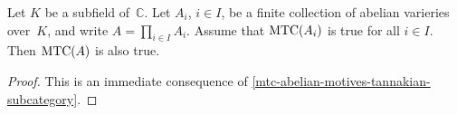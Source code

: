 \documentclass[10pt,twoside,leqno]{article}
\numberwithin{equation}{subsection}
\newcommand{\CC}{\mathbb{C}}
\newcommand{\MTC}{\textnormal{MTC}}
\begin{document}
\begin{theorem} %
 \label{mtcaxa}
 Let $K$ be a subfield of~$\CC$.
 Let $A_i$, $i \in I$, be a finite collection of abelian varieries over~$K$,
	and write $A = \prod_{i \in I} A_i$.
 Assume that $\MTC(A_i)$ is true for all $i \in I$.
 Then $\MTC(A)$ is also true.
 \begin{proof}
  This is an immediate consequence of
  \cref{mtc-abelian-motives-tannakian-subcategory}.
 \end{proof}
\end{theorem}


\printbibliography
\end{document}
